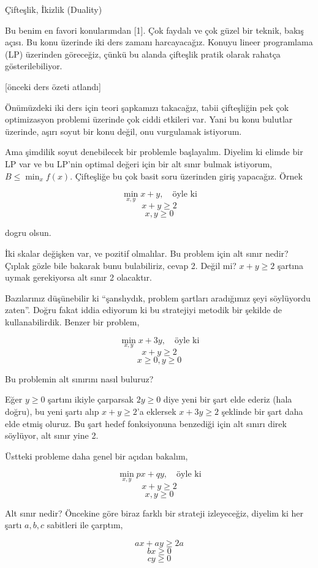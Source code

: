 \documentclass[12pt,fleqn]{article}\usepackage{../../common}
\begin{document}
Çifteşlik, İkizlik (Duality)

Bu benim en favori konularımdan [1]. Çok faydalı ve çok güzel bir teknik,
bakış açısı. Bu konu üzerinde iki ders zamanı harcayacağız. Konuyu lineer
programlama (LP) üzerinden göreceğiz, çünkü bu alanda çifteşlik pratik
olarak rahatça gösterilebiliyor.

[önceki ders özeti atlandı]

Önümüzdeki iki ders için teori şapkamızı takacağız, tabii çifteşliğin pek
çok optimizasyon problemi üzerinde çok ciddi etkileri var. Yani bu konu
bulutlar üzerinde, aşırı soyut bir konu değil, onu vurgulamak istiyorum. 

Ama şimdilik soyut denebilecek bir problemle başlayalım. Diyelim ki elimde
bir LP var ve bu LP'nin optimal değeri için bir alt sınır bulmak istiyorum,
$B \le \min_x f(x)$. Çifteşliğe bu çok basit soru üzerinden giriş
yapacağız. Örnek

$$
\min_{x,y} x+y, \quad \textrm{öyle ki}
$$
$$
x + y \ge 2 
$$
$$
x,y \ge 0
$$

dogru olsun. 

İki skalar değişken var, ve pozitif olmalılar. Bu problem için alt sınır
nedir? Çıplak gözle bile bakarak bunu bulabiliriz, cevap 2. Değil mi? $x+y
\ge 2$ şartına uymak gerekiyorsa alt sınır 2 olacaktır. 

Bazılarınız düşünebilir ki ``şanslıydık, problem şartları aradığımız şeyi
söylüyordu zaten''. Doğru fakat iddia ediyorum ki bu stratejiyi metodik bir
şekilde de kullanabilirdik. Benzer bir problem, 

$$
\min_{x,y} x + 3y, \quad \textrm{öyle ki}
$$
$$
x + y \ge 2 
$$
$$
x \ge 0, y \ge 0
$$

Bu problemin alt sınırını nasıl buluruz?

Eğer $y \ge 0$ şartını ikiyle çarparsak $2y \ge 0$ diye yeni bir şart elde
ederiz (hala doğru), bu yeni şartı alıp $x + y \ge 2 $'a eklersek $x + 3y
\ge 2 $ şeklinde bir şart daha elde etmiş oluruz. Bu şart hedef
fonksiyonuna benzediği için alt sınırı direk söylüyor, alt sınır yine 2.
 
Üstteki probleme daha genel bir açıdan bakalım,

$$
\min_{x,y} px + qy, \quad \textrm{öyle ki}
$$
$$
x + y \ge 2
$$
$$
x,y \ge 0
$$

Alt sınır nedir? Öncekine göre biraz farklı bir strateji izleyeceğiz,
diyelim ki her şartı $a,b,c$ sabitleri ile çarptım, 

$$
ax + ay \ge 2a
$$
$$
bx \ge 0
$$
$$
cy \ge 0
$$
\end{document}
